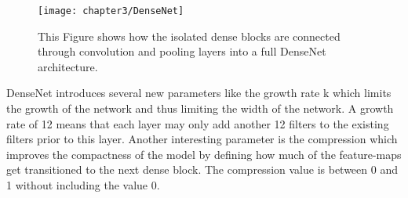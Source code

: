 \begin{figure}[H]
  \centering
  \caption{This Figure shows how the isolated dense blocks are connected through convolution and pooling layers into a full DenseNet architecture. \cite{huang2017densely}}
  \texttt{[image: chapter3/DenseNet]}
  \label{fig:DenseNet}
\end{figure}

DenseNet introduces several new parameters like the growth rate k which limits the growth of the network and thus limiting the width of the network. A growth rate of 12 means that each layer may only add another 12 filters to the existing filters prior to this layer. Another interesting parameter is the compression which improves the compactness of the model by defining how much of the feature-maps get transitioned to the next dense block. The compression value is between 0 and 1 without including the value 0.